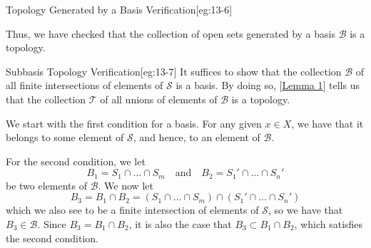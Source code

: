 \begin{egBox}{Topology Generated by a Basis Verification}[eg:13-6]
    \baseSkip

    Thus, we have checked that the collection of open sets generated by a 
    basis \( \mathcal{B} \) is a topology. 
\end{egBox}

\begin{egBox}{Subbasis Topology Verification}[eg:13-7]
    It suffices to show that the collection \( \mathcal{B} \) of all finite 
    intersections of elements of \( \mathcal{S} \) is a basis. 
    By doing so, [\hyperlink{lem:13.1}{Lemma 1}] tells us that the collection 
    \( \mathcal{T} \) of all unions of elements of \( \mathcal{B} \) is a 
    topology.

    \baseSkip

    We start with the first condition for a basis.
    For any given \( x \in X \), we have that it belongs to some element of 
    \( \mathcal{S} \), and hence, to an element of \( \mathcal{B} \).

    \baseSkip 

    For the second condition, we let 
    \begin{equation*}
        B_{ 1 } 
        =
        S_{ 1 } \cap \ldots \cap S_{ m }
        \quad \mathrm{and} \quad
        B_{ 2 }
        =
        S_{ 1 }' \cap \ldots \cap S_{ n }'
    \end{equation*}
    be two elements of \( \mathcal{B} \). 
    We now let 
    \begin{equation*}
        B_{ 3 } 
        =
        B_{ 1 } \cap B_{ 2 }
        =
        ( S_{ 1 } \cap \ldots \cap S_{ m } )
        \cap 
        ( S_{ 1 }' \cap \ldots \cap S_{ n }' )
    \end{equation*}
    which we also see to be a finite intersection of elements of 
    \( \mathcal{S} \), so we have that \( B_{ 3 } \in \mathcal{B} \).
    Since \( B_{ 3 } = B_{ 1 } \cap B_{ 2 } \), it is also the case that 
    \( B_{ 3 } \subset B_{ 1 } \cap B_{ 2 } \), which satisfies the 
    second condition.
\end{egBox}